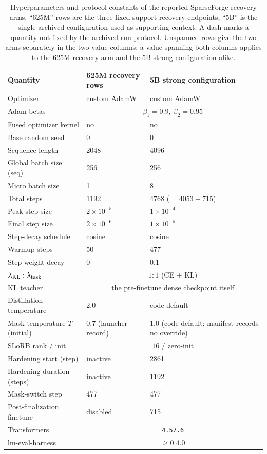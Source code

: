 \documentclass{article}
\begin{document}
\begin{table}[H]
\centering\small
\caption{Hyperparameters and protocol constants of the reported SparseForge
recovery arms. ``625M'' rows are the three fixed-support recovery endpoints;
``5B'' is the single archived configuration used as supporting context. A dash marks a
quantity not fixed by the archived run protocol. Unspanned rows give the two
arms separately in the two value columns; a value spanning both columns applies
to the 625M recovery arm and the 5B strong configuration alike.}
\label{tab:hyperparams}
\setlength{\tabcolsep}{5pt}
\begin{tabular}{@{}lll@{}}
\toprule
Quantity & 625M recovery rows & 5B strong configuration \\
\midrule
Optimizer & custom AdamW & custom AdamW \\
Adam betas & \multicolumn{2}{c}{$\beta_1{=}0.9,\ \beta_2{=}0.95$} \\
Fused optimizer kernel & no & no \\
Base random seed & 0 & 0 \\
Sequence length & 2048 & 4096 \\
Global batch size (seq) & 256 & 256 \\
Micro batch size & 1 & 8 \\
Total steps & 1192 & 4768 ($=4053{+}715$) \\
Peak step size & $2\times10^{-5}$ & $1\times10^{-4}$ \\
Final step size & $2\times10^{-6}$ & $1\times10^{-5}$ \\
Step-decay schedule & cosine & cosine \\
Warmup steps & 50 & 477 \\
Step-weight decay & 0 & 0.1 \\
$\lambda_{\rm KL}:\lambda_{\rm task}$ & \multicolumn{2}{c}{$1{:}1$ (CE + KL)} \\
KL teacher & \multicolumn{2}{c}{the pre-finetune dense checkpoint itself} \\
Distillation temperature & 2.0 & code default\footnotemark \\
Mask-temperature $T$ (initial) & 0.7 (launcher record) & 1.0 (code default; manifest records no override\footnotemark) \\
SLoRB rank / init & \multicolumn{2}{c}{$16$ / zero-init} \\
Hardening start (step) & inactive & 2861 \\
Hardening duration (steps) & inactive & 1192 \\
Mask-switch step & 477 & 477 \\
Post-finalization finetune & disabled & 715 \\
Transformers & \multicolumn{2}{c}{\texttt{4.57.6}} \\
lm-eval-harness & \multicolumn{2}{c}{$\geq0.4.0$} \\
\bottomrule
\end{tabular}
\end{table}
\end{document}
